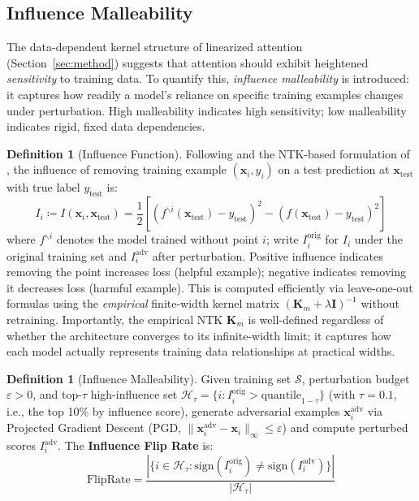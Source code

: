 \documentclass{article}
\theoremstyle{plain}
\theoremstyle{definition}
\newtheorem{definition}[theorem]{Definition}
\theoremstyle{remark}
\begin{document}
\subsection{Influence Malleability}

The data-dependent kernel structure of linearized attention (Section~\ref{sec:method}) suggests that attention should exhibit heightened \emph{sensitivity} to training data. To quantify this, \emph{influence malleability} is introduced: it captures how readily a model's reliance on specific training examples changes under perturbation. High malleability indicates high sensitivity; low malleability indicates rigid, fixed data dependencies.

\begin{definition}[Influence Function]
\label{def:influence}
Following \citet{koh2017understanding} and the NTK-based formulation of \citet{zhang2022rethinking}, the influence of removing training example $(\mathbf{x}_i, y_i)$ on a test prediction at $\mathbf{x}_{\text{test}}$ with true label $y_{\text{test}}$ is:
\begin{equation}
I_i \coloneq I(\mathbf{x}_i, \mathbf{x}_{\text{test}}) = \frac{1}{2}\left[(f^{\backslash i}(\mathbf{x}_{\text{test}}) - y_{\text{test}})^2 - (f(\mathbf{x}_{\text{test}}) - y_{\text{test}})^2\right]
\end{equation}
where $f^{\backslash i}$ denotes the model trained without point $i$; write $I_i^{\text{orig}}$ for $I_i$ under the original training set and $I_i^{\text{adv}}$ after perturbation. Positive influence indicates removing the point increases loss (helpful example); negative indicates removing it decreases loss (harmful example). This is computed efficiently via leave-one-out formulas using the \emph{empirical} finite-width kernel matrix $(\mathbf{K}_m + \lambda\mathbf{I})^{-1}$ without retraining. Importantly, the empirical NTK $\mathbf{K}_m$ is well-defined regardless of whether the architecture converges to its infinite-width limit; it captures how each model actually represents training data relationships at practical widths.
\end{definition}

\begin{definition}[Influence Malleability]
\label{def:influence_malleability}
Given training set $\mathcal{S}$, perturbation budget $\varepsilon > 0$, and top-$\tau$ high-influence set $\mathcal{H}_\tau = \{i : I_i^{\text{orig}} > \text{quantile}_{1-\tau}\}$ (with $\tau = 0.1$, i.e., the top 10\% by influence score), generate adversarial examples $\mathbf{x}_i^{\text{adv}}$ via Projected Gradient Descent (PGD, $\|\mathbf{x}_i^{\text{adv}} - \mathbf{x}_i\|_\infty \leq \varepsilon$) and compute perturbed scores $I_i^{\text{adv}}$. The \textbf{Influence Flip Rate} is:
\begin{equation}
\mathrm{FlipRate} = \frac{|\{i \in \mathcal{H}_\tau : \mathrm{sign}(I_i^{\mathrm{orig}}) \neq \mathrm{sign}(I_i^{\mathrm{adv}})\}|}{|\mathcal{H}_\tau|}
\end{equation}
\end{definition}
\end{document}
